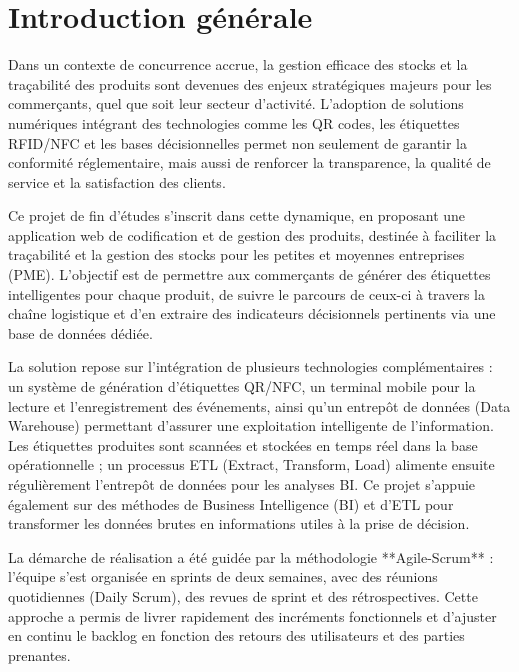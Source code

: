 \documentclass[12pt,a4paper]{report}
\begin{document}
\chapter*{Introduction générale}

Dans un contexte de concurrence accrue, la gestion efficace des stocks et la traçabilité des produits sont devenues des enjeux stratégiques majeurs pour les commerçants, quel que soit leur secteur d’activité. L’adoption de solutions numériques intégrant des technologies comme les QR codes, les étiquettes RFID/NFC et les bases décisionnelles permet non seulement de garantir la conformité réglementaire, mais aussi de renforcer la transparence, la qualité de service et la satisfaction des clients.

Ce projet de fin d’études s’inscrit dans cette dynamique, en proposant une application web de codification et de gestion des produits, destinée à faciliter la traçabilité et la gestion des stocks pour les petites et moyennes entreprises (PME). L'objectif est de permettre aux commerçants de générer des étiquettes intelligentes pour chaque produit, de suivre le parcours de ceux-ci à travers la chaîne logistique et d’en extraire des indicateurs décisionnels pertinents via une base de données dédiée.

La solution repose sur l’intégration de plusieurs technologies complémentaires : un système de génération d’étiquettes QR/NFC, un terminal mobile pour la lecture et l’enregistrement des événements, ainsi qu’un entrepôt de données (Data Warehouse) permettant d’assurer une exploitation intelligente de l’information. Les étiquettes produites sont scannées et stockées en temps réel dans la base opérationnelle ; un processus ETL (Extract, Transform, Load) alimente ensuite régulièrement l’entrepôt de données pour les analyses BI. Ce projet s'appuie également sur des méthodes de Business Intelligence (BI) et d’ETL pour transformer les données brutes en informations utiles à la prise de décision.

La démarche de réalisation a été guidée par la méthodologie **Agile-Scrum** : l’équipe s’est organisée en sprints de deux semaines, avec des réunions quotidiennes (Daily Scrum), des revues de sprint et des rétrospectives. Cette approche a permis de livrer rapidement des incréments fonctionnels et d’ajuster en continu le backlog en fonction des retours des utilisateurs et des parties prenantes.
\end{document}
